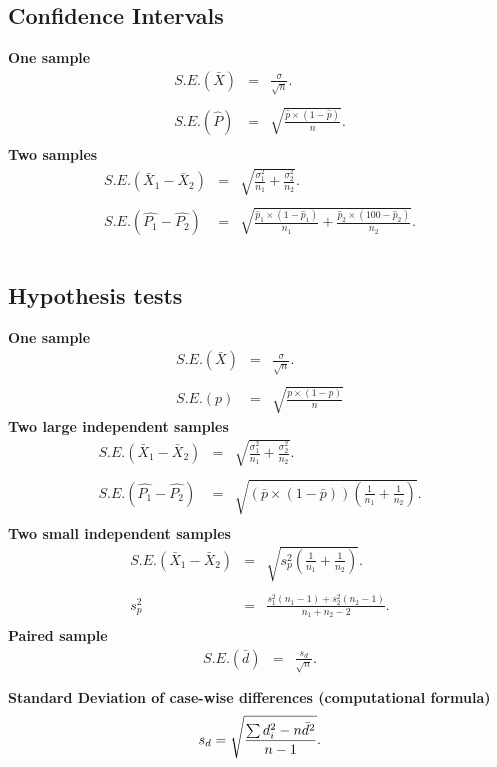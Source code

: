 \documentclass[a4paper,12pt]{article}
\begin{document}
\subsection*{Confidence Intervals}
{\bf One sample}
\begin{eqnarray*} S.E.(\bar{X})&=&\frac{\sigma}{\sqrt{n}}.\\\\
	S.E.(\hat{P})&=&\sqrt{\frac{\hat{p}\times(1-\hat{p})}{n}}.\\
\end{eqnarray*}
{\bf Two samples}
\begin{eqnarray*}
	S.E.(\bar{X}_1-\bar{X}_2)&=&\sqrt{\frac{\sigma^2_1}{n_1}+\frac{\sigma_2^2}{n_2}}.\\\\
	S.E.(\hat{P_1}-\hat{P_2})&=&\sqrt{\frac{\hat{p}_1\times(1-\hat{p}_1)}{n_1}+\frac{\hat{p}_2\times(100-\hat{p}_2)}{n_2}}.\\\\
\end{eqnarray*}
\subsection*{Hypothesis tests}
{\bf One sample}
\begin{eqnarray*}
	S.E.(\bar{X})&=&\frac{\sigma}{\sqrt{n}}.\\\\
	S.E.(p)&=&\sqrt{\frac{p \times(1-p)}{n}}
\end{eqnarray*}
{\bf Two large independent samples}
\begin{eqnarray*}
	S.E.(\bar{X}_1-\bar{X}_2)&=&\sqrt{\frac{\sigma^2_1}{n_1}+\frac{\sigma_2^2}{n_2}}.\\\\
	S.E.(\hat{P_1}-\hat{P_2})&=&\sqrt{\left(\bar{p}\times(1-\bar{p})\right)\left(\frac{1}{n_1}+\frac{1}{n_2}\right)}.\\
\end{eqnarray*}
{\bf Two small independent samples}
\begin{eqnarray*}
	S.E.(\bar{X}_1-\bar{X}_2)&=&\sqrt{s_p^2\left(\frac{1}{n_1}+\frac{1}{n_2}\right)}.\\\\
	s_p^2&=&\frac{s_1^2(n_1-1)+s_2^2(n_2-1)}{n_1+n_2-2}.\\
\end{eqnarray*}
{\bf Paired sample}
\begin{eqnarray*}
	S.E.(\bar{d})&=&\frac{s_d}{\sqrt{n}}.\\\\
\end{eqnarray*}
{\bf Standard Deviation of case-wise differences (computational formula)}
\begin{eqnarray*}
	s_d = \sqrt{ {\sum d_i^2 - n\bar{d}^2 \over n-1}}.\\\\
\end{eqnarray*}
\end{document}
